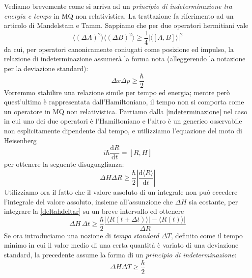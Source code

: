 \documentclass[a4paper]{report}
\begin{document}
Vediamo brevemente come si arriva ad un \textit{principio di indeterminazione tra energia e tempo} in MQ non relativistica. La trattazione fa riferimento ad un articolo di Mandelstam e Tamm. Sappiamo che per due operatori hermitiani vale
\begin{equation}
    \langle(\Delta A)^2\rangle\langle(\Delta B)^2\rangle \geq \frac{1}{4}\left|\langle\left[A,B\right]\rangle\right|^2
    \label{indeterminazione}
\end{equation}
da cui, per operatori canonicamente coniugati come posizione ed impulso, la relazione di indeterminazione assumerà la forma nota (alleggerendo la notazione per la deviazione standard):
\begin{equation}
\Delta x \Delta p \geq \frac{\hbar}{2}
\end{equation}
Vorremmo stabilire una relazione simile per tempo ed energia; mentre però quest'ultima è rappresentata dall'Hamiltoniano, il tempo non si comporta come un operatore in MQ non relativistica. Partiamo dalla \eqref{indeterminazione} nel caso in cui uno dei due operatori è l'Hamiltoniano e l'altro è un generico osservabile non esplicitamente dipendente dal tempo, e utilizziamo l'equazione del moto di Heisenberg
\begin{equation}
    i\hbar\frac{\mathrm{d}R}{\mathrm{d}t} = \left[R,H\right]
\end{equation}
per ottenere la seguente disuguaglianza:
\begin{equation}
    \Delta H \Delta R \geq \frac{\hbar}{2} \left|\frac{\mathrm{d}\langle R\rangle}{\mathrm{d}t}\right|
    \label{deltahdeltar}
\end{equation}
Utilizziamo ora il fatto che il valore assoluto di un integrale non può eccedere l'integrale del valore assoluto, insieme all'assunzione che $\Delta H$ sia costante, per integrare la \eqref{deltahdeltar} su un breve intervallo ed ottenere 
\begin{equation}
    \Delta H \,\Delta t \geq \frac{\hbar}{2}\frac{|\langle R(t+\Delta t)\rangle|-\langle R(t)\rangle|}{\Delta R}
\end{equation}
Se ora introduciamo una nozione di \textit{tempo standard} $\Delta T$, definito come il tempo minimo in cui il valor medio di una certa quantità è variato di una deviazione standard, la precedente assume la forma di un \textit{principio di indeterminazione}:
\begin{equation}
    \Delta H \Delta T \geq \frac{\hbar}{2}
    \label{indeterminazioneET}
\end{equation}
\end{document}
